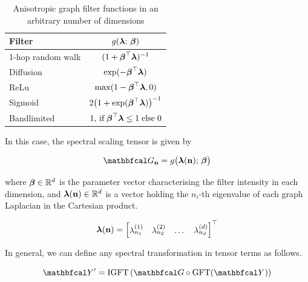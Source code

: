 \begin{table}[t]
    \def\arraystretch{1.7}
    \small
    \begin{center}
        \begin{tabular}{|l|c|}
            \hline
            \textbf{Filter}   & $g(\boldsymbol{\lambda}; \,\boldsymbol{\beta})$                                            \\
            \hline
            1-hop random walk & $(1 + \boldsymbol{\beta}^\top\boldsymbol{\lambda})^{-1}$                                   \\
            \hline
            Diffusion         & $\exp(-\boldsymbol{\beta}^\top\boldsymbol{\lambda})$                                       \\
            \hline
            ReLu              & $\max (1 - \boldsymbol{\beta}^\top\boldsymbol{\lambda}, 0)$                                \\
            \hline
            Sigmoid           & $2 \big( 1 + \exp(\boldsymbol{\beta}^\top\boldsymbol{\lambda})\big)^{-1}$                  \\
            \hline
            Bandlimited       & $1, \,\text{if} \; \boldsymbol{\beta}^\top\boldsymbol{\lambda} \leq 1 \; \text{else} \; 0$ \\
            \hline
        \end{tabular}
    \end{center}
    \caption{Anisotropic graph filter functions in an arbitrary number of dimensions}
    \label{tab:anis_filters}
\end{table}


In this case, the spectral scaling tensor is given by 

\begin{equation}
    \label{eq:Gn_dd2}
    \Gt_{\nn} = g\big(\lambdaa(\nn); \, \betaa\big)
\end{equation}

where $\boldsymbol{\beta} \in \mathbb{R}^{d}$ is the parameter vector characterising the filter intensity in each dimension, and $\boldsymbol{\lambda}(\mathbf{n}) \in \mathbb{R}^d$ is a vector holding the $n_i$-th eigenvalue of each graph Laplacian in the Cartesian product. 

$$
\boldsymbol{\lambda}(\mathbf{n}) = 
\begin{bmatrix}
    \lambda^{(1)}_{n_1} & \lambda^{(2)}_{n_2} & \dots & \lambda^{(d)}_{n_d}    
\end{bmatrix}^\top
$$

In general, we can define any spectral transformation in tensor terms as follows. 

\begin{equation}
    \Yt' = \text{IGFT} \left( \Gt \circ \text{GFT}(\Yt) \right)
\end{equation}

